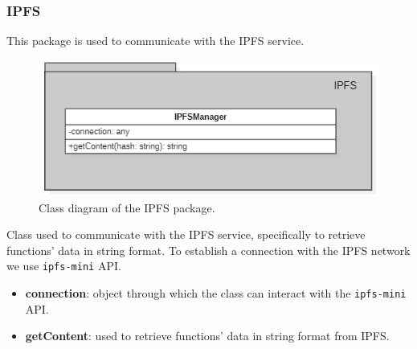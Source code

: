	\subsubsection{IPFS}
	This package is used to communicate with the IPFS service.
	\begin{figure} [h!]
		\centering
		\includegraphics[width=0.8\linewidth]{diagrammi/etherless-server/IPFS}
		\caption{Class diagram of the IPFS package.}
	\end{figure}
	Class used to communicate with the IPFS service, specifically to retrieve functions' data in string format. To establish a connection with the IPFS network we use \texttt{ipfs-mini} API. 
	\begin{itemize}
		\item \textbf{connection}: object through which the class can interact with the \texttt{ipfs-mini} API.
	\end{itemize}
	\begin{itemize}
		\item \textbf{getContent}: used to retrieve functions' data in string format from IPFS.
	\end{itemize}
